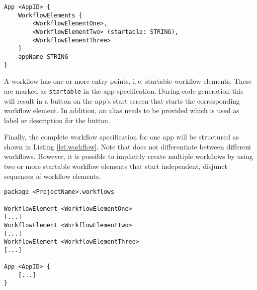 \begin{lstlisting}[language=MD2, label=lst:app, caption=App Definition in \MD]
App <AppID> {
	WorkflowElements {
		<WorkflowElementOne>,
		<WorkflowElementTwo> (startable: STRING),
		<WorkflowElementThree> 
	}
	appName STRING
}
\end{lstlisting}

A workflow has one or more entry points, i.\,e. startable workflow elements. These are marked as {\lstinline!startable!} in the app specification. During code generation this will result in a button on the app's start screen that starts the corresponding workflow element. In addition, an alias needs to be provided which is used as label or description for the button.

Finally, the complete workflow specification for one app will be structured as shown in Listing \ref{lst:workflow}. Note that \MD does not differentiate between different workflows. However, it is possible to implicitly create multiple workflows by using two or more startable workflow elements that start independent, disjunct sequences of workflow elements.

\begin{lstlisting}[language=MD2, label=lst:workflow, caption=Workflow Definition in \MD]
package <ProjectName>.workflows

WorkflowElement <WorkflowElementOne>
[...]
WorkflowElement <WorkflowElementTwo>
[...]
WorkflowElement <WorkflowElementThree>
[...]

App <AppID> {
	[...]
}
\end{lstlisting}